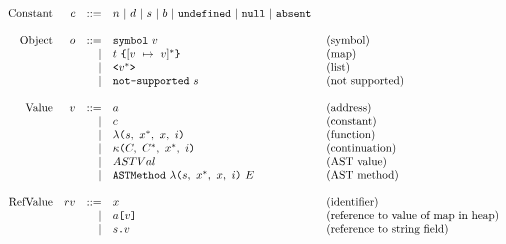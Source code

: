 \[
\begin{array}{rrrll}
\text{Constant} & c & ::= & n\ |\ d\ |\ s\ |\ b\ |\
\texttt{undefined}\ |\ \texttt{null}\ |\ \texttt{absent}\ & \\
\\
\text{Object} & o & ::= & \texttt{symbol}\ v & \text{(symbol)}\\
&&|& t\ \texttt{\{} [v\ \mapsto\ v]^* \texttt{\}} & \text{(map)}\\
&&|& \texttt{<} v^* \texttt{>} & \text{(list)}\\
&&|& \texttt{not-supported}\ s & \text{(not supported)}\\
\\
\text{Value} & v & ::= & a & \text{(address)} \\
&&|& c & \text{(constant)}\\
&&|& \lambda \texttt{(} s,\ x^*,\ x,\ i \texttt{)} & \text{(function)} \\
&&|& \kappa \texttt{(} C,\ C^*,\ x^*,\ i \texttt{)} & \text{(continuation)} \\
&&|& ASTVal & \text{(AST value)}\\
&&|& \texttt{ASTMethod}\ \lambda \texttt{(} s,\ x^*,\ x,\ i \texttt{)}\ E & \text{(AST method)}\\
\\

\text{RefValue} & rv & ::= & x & \text{(identifier)}\\
&&|& a\texttt{[} v \texttt{]} & \text{(reference to value of map in heap)}\\
&&|& s\texttt{.}v & \text{(reference to string field)}\\
\\


\end{array}
\]

